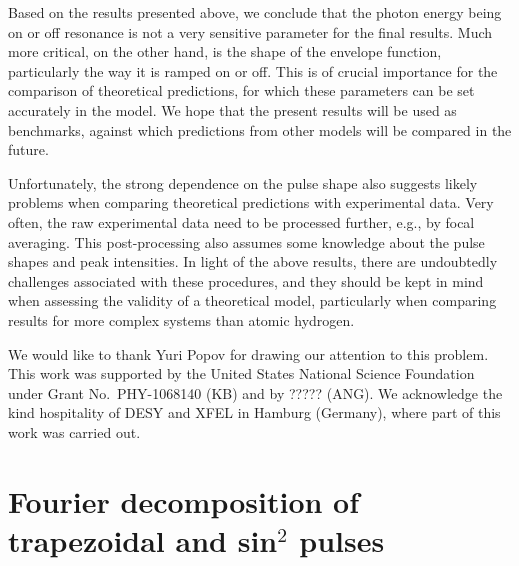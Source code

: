 \documentclass[aps,pra,amsmath,amssymb,showpacs,twocolumn,preprintnumbers,
floatfix,letterpaper]{revtex4-1}
\begin{document}
Based on the results presented above, we conclude that the photon energy being on or off resonance is not a very 
sensitive parameter for the final results. Much more critical, on the other hand, is the shape of
the envelope function, particularly the way it is ramped on or off.  This is of crucial importance
for the comparison of theoretical predictions, for which these parameters can be set accurately in the
model. We hope that the present results will be used as benchmarks, against which predictions from
other models will be compared in the future.

Unfortunately, the strong dependence on the pulse shape also suggests likely problems when comparing
theoretical predictions with experimental data.  Very often, the raw experimental data need to be processed
further, e.g., by focal averaging.  This post-processing also assumes some knowledge about the 
pulse shapes and peak intensities. In light of the above results, there are undoubtedly challenges 
associated with these procedures, and they should be kept in mind when assessing the validity of
a theoretical model, particularly when comparing results for more complex systems than atomic hydrogen.

 
\begin{acknowledgments}
We would like to thank Yuri Popov for drawing our attention to this problem.
This work was supported by the United States National Science Foundation under Grant No.~PHY-1068140 (KB) 
and by ????? (ANG).
We acknowledge the kind hospitality of DESY and XFEL in Hamburg (Germany), where part of this work was carried out.
\end{acknowledgments}

\appendix

\section{Fourier decomposition of trapezoidal and sin$^2$ pulses}
\end{document}

